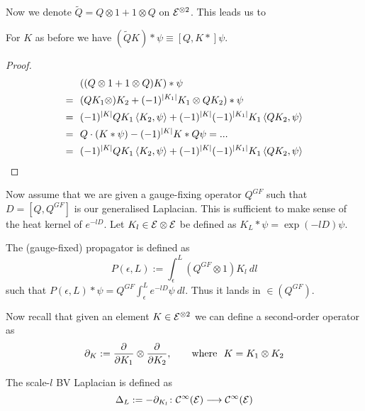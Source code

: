 Now we denote $\widetilde{Q} = Q \otimes 1 + 1 \otimes Q$ on ${\mathcal{E}}^{\otimes 2}$. This leads us to

\begin{lem}
  For $K$ as before we have $(\widetilde{Q} K) * \psi \equiv [Q, K *] \psi$.
\begin{proof}
  \begin{align}
    &((Q \otimes 1 + 1 \otimes Q ) K ) * \psi \\
    = \ \ &(QK_1 \otimes ) K_2 + (-1)^{|K_1|} K_1 \otimes Q K_2 ) * \psi \\
    = \ \ & (-1)^{|K|} QK_1 \left\langle K_2 , \psi \right\rangle + (-1)^{|K|} (-1)^{|K_1|} K_1 \left\langle Q K_2 , \psi \right\rangle \\
    = \ \ & Q \cdot (K*\psi) - (-1)^{|K|} K * Q \psi = ... \\
    = \ \ &(-1)^{|K|} QK_1 \left\langle K_2 , \psi \right\rangle + (-1)^{|K|} (-1)^{|K_1|} K_1 \left\langle QK_2 , \psi \right\rangle
  \end{align}
\end{proof}
\end{lem}

Now assume that we are given a gauge-fixing operator $Q^{GF}$ such that $D = [Q, Q^{GF}]$ is our generalised Laplacian. This is sufficient to make sense of the heat kernel of $e^{-lD}$. Let $K_l \in {\mathcal{E}} \otimes {\mathcal{E}}$ be defined as $K_L * \psi = \exp(-lD) \psi$.

\begin{definition}
  The (gauge-fixed) propagator is defined as
  \begin{equation}
    P(\epsilon, L) := \int_\epsilon^L (Q^{GF} \otimes 1) K_l \ dl
  \end{equation}
  such that $P(\epsilon,L) * \psi = Q^{GF} \int_\epsilon^L e^{-lD} \psi \ dl$. Thus it lands in $\in(Q^{GF})$.
\end{definition}

Now recall that given an element $K \in {\mathcal{E}}^{\otimes 2}$ we can define a second-order operator as
\begin{equation}
  \partial_K := \frac{\partial }{\partial K_1} \otimes \frac{\partial }{\partial K_2}, \quad \quad \text{where} \ \ K = K_1 \otimes K_2
\end{equation}

\begin{definition}
  The scale-$l$ BV Laplacian is defined as
  \begin{equation}
    \Delta_L := - \partial_{K_l} \colon \mathcal{C}^{\infty}({\mathcal{E}}) \longrightarrow \mathcal{C}^{\infty}({\mathcal{E}})
  \end{equation}
\end{definition}

